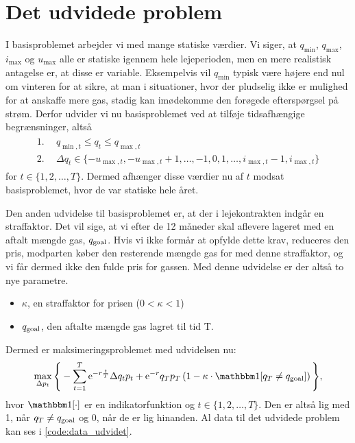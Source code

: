 \section{Det udvidede problem} \label{kap:udvidet_problem}

I basisproblemet arbejder vi med mange statiske værdier. Vi siger, at $q_{\min}$, $q_{\max}$, $i_{\max}$ og $u_{\max}$ alle er statiske igennem hele lejeperioden, men en mere realistisk antagelse er, at disse er variable. Eksempelvis vil $q_{\min}$ typisk være højere end nul om vinteren for at sikre, at man i situationer, hvor der pludselig ikke er mulighed for at anskaffe mere gas, stadig kan imødekomme den forøgede efterspørgsel på strøm. Derfor udvider vi nu basisproblemet ved at tilføje tidsafhængige begrænsninger, altså
\begin{align}
\begin{split}
\textrm{1.}& \ \ q_{\min,t} \leq q_{t} \leq q_{\max,t} \\
\textrm{2.}& \ \ \Delta q_{t} \in \{-u_{\max,t}, -u_{\max,t} + 1, \dotsc, -1, 0, 1, \dotsc, i_{\max,t} -1, i_{\max,t} \}
\end{split}
\end{align}
for $t \in \{1,2,\dotsc,T \}$. Dermed afhænger disse værdier nu af $t$ modsat basisproblemet, hvor de var statiske hele året. 

Den anden udvidelse til basisproblemet er, at der i lejekontrakten indgår en straffaktor. Det vil sige, at vi efter de 12 måneder skal aflevere lageret med en aftalt mængde gas, $q_{\textrm{goal}}$. Hvis vi ikke formår at opfylde dette krav, reduceres den pris, modparten køber den resterende mængde gas for med denne straffaktor, og vi får dermed ikke den fulde pris for gassen. Med denne udvidelse er der altså to nye parametre.
\begin{itemize}
\item $\kappa$, en straffaktor for prisen ($0 < \kappa < 1$)
\item $q_{\textrm{goal}}$, den aftalte mængde gas lagret til tid T.
\end{itemize}
Dermed er maksimeringsproblemet med udvidelsen nu:
\begin{equation}
\max_{\Delta p_{t}} \Bigg\{ -\sum_{t=1}^{T} \mathrm{e}^{-r\frac{t}{T}} \Delta q_{t} p_{t}+ \mathrm{e}^{-r}q_{T}p_{T} \left (1- \kappa \cdot \ind [q_{T} \neq q_{\goal}] \right )  \Bigg\}, 
\end{equation}
hvor $\ind [\cdot]$ er en indikatorfunktion og $t \in \{1,2,\dotsc,T \}$. Den er altså lig med 1, når $q_{T} \neq q_{\textrm{goal}}$ og 0, når de er lig hinanden. Al data til det udvidede problem kan ses i \autoref{code:data_udvidet}.